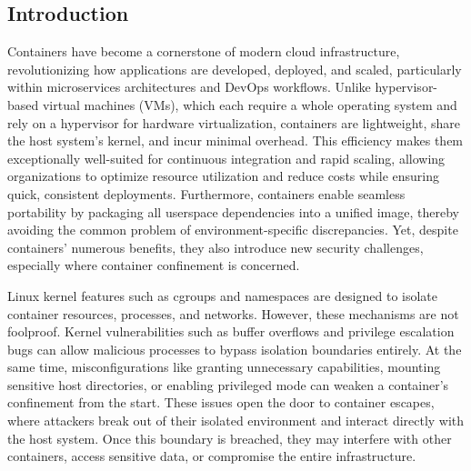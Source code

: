 \documentclass[12pt]{report}
\providecommand{\DIFaddend}{} %
\DeclareRobustCommand{\DIFaddend}{\DIFOaddend \let\includegraphics\DIFOincludegraphics} %
\begin{document}
\DIFaddend \fontsize{12pt}{14pt} \selectfont
\begin{doublespace}
\chapter{Introduction}

Containers have become a cornerstone of modern cloud infrastructure, revolutionizing how applications are developed, deployed, and scaled, particularly within microservices architectures and DevOps workflows. Unlike hypervisor-based virtual machines (VMs), which each require a whole operating system and rely on a hypervisor for hardware virtualization, containers are lightweight, share the host system's kernel, and incur minimal overhead. This efficiency makes them exceptionally well-suited for continuous integration and rapid scaling, allowing organizations to optimize resource utilization and reduce costs while ensuring quick, consistent deployments. Furthermore, containers enable seamless portability by packaging all userspace dependencies into a unified image, thereby avoiding the common problem of environment-specific discrepancies. Yet, despite containers' numerous benefits, they also introduce new security challenges, especially where container confinement is concerned.

Linux kernel features such as cgroups and namespaces are designed to isolate container resources, processes, and networks. However, these mechanisms are not foolproof. Kernel vulnerabilities such as buffer overflows and privilege escalation bugs can allow malicious processes to bypass isolation boundaries entirely. At the same time, misconfigurations like granting unnecessary capabilities, mounting sensitive host directories, or enabling privileged mode can weaken a container's confinement from the start. These issues open the door to container escapes, where attackers break out of their isolated environment and interact directly with the host system. Once this boundary is breached, they may interfere with other containers, access sensitive data, or compromise the entire infrastructure.


\end{doublespace}
\end{document}
